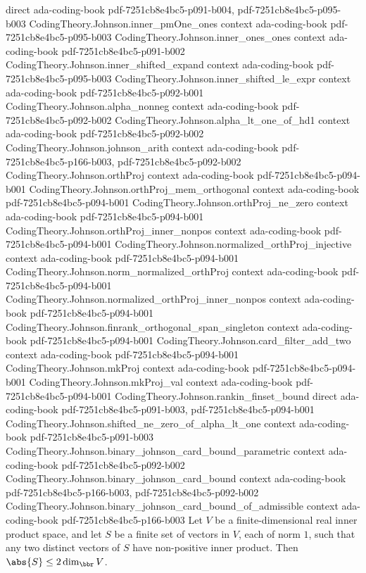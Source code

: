 \begin{theorem}
  {direct}
  {ada-coding-book}
  {pdf-7251cb8e4bc5-p091-b004,
    pdf-7251cb8e4bc5-p095-b003}
\proofstep
  {CodingTheory.Johnson.inner_pmOne_ones}
  {context}
  {ada-coding-book}
  {pdf-7251cb8e4bc5-p095-b003}
\proofstep
  {CodingTheory.Johnson.inner_ones_ones}
  {context}
  {ada-coding-book}
  {pdf-7251cb8e4bc5-p091-b002}
\proofstep
  {CodingTheory.Johnson.inner_shifted_expand}
  {context}
  {ada-coding-book}
  {pdf-7251cb8e4bc5-p095-b003}
\proofstep
  {CodingTheory.Johnson.inner_shifted_le_expr}
  {context}
  {ada-coding-book}
  {pdf-7251cb8e4bc5-p092-b001}
\proofstep
  {CodingTheory.Johnson.alpha_nonneg}
  {context}
  {ada-coding-book}
  {pdf-7251cb8e4bc5-p092-b002}
\proofstep
  {CodingTheory.Johnson.alpha_lt_one_of_hd1}
  {context}
  {ada-coding-book}
  {pdf-7251cb8e4bc5-p092-b002}
\proofstep
  {CodingTheory.Johnson.johnson_arith}
  {context}
  {ada-coding-book}
  {pdf-7251cb8e4bc5-p166-b003,
    pdf-7251cb8e4bc5-p092-b002}
\proofstep
  {CodingTheory.Johnson.orthProj}
  {context}
  {ada-coding-book}
  {pdf-7251cb8e4bc5-p094-b001}
\proofstep
  {CodingTheory.Johnson.orthProj_mem_orthogonal}
  {context}
  {ada-coding-book}
  {pdf-7251cb8e4bc5-p094-b001}
\proofstep
  {CodingTheory.Johnson.orthProj_ne_zero}
  {context}
  {ada-coding-book}
  {pdf-7251cb8e4bc5-p094-b001}
\proofstep
  {CodingTheory.Johnson.orthProj_inner_nonpos}
  {context}
  {ada-coding-book}
  {pdf-7251cb8e4bc5-p094-b001}
\proofstep
  {CodingTheory.Johnson.normalized_orthProj_injective}
  {context}
  {ada-coding-book}
  {pdf-7251cb8e4bc5-p094-b001}
\proofstep
  {CodingTheory.Johnson.norm_normalized_orthProj}
  {context}
  {ada-coding-book}
  {pdf-7251cb8e4bc5-p094-b001}
\proofstep
  {CodingTheory.Johnson.normalized_orthProj_inner_nonpos}
  {context}
  {ada-coding-book}
  {pdf-7251cb8e4bc5-p094-b001}
\proofstep
  {CodingTheory.Johnson.finrank_orthogonal_span_singleton}
  {context}
  {ada-coding-book}
  {pdf-7251cb8e4bc5-p094-b001}
\proofstep
  {CodingTheory.Johnson.card_filter_add_two}
  {context}
  {ada-coding-book}
  {pdf-7251cb8e4bc5-p094-b001}
\proofstep
  {CodingTheory.Johnson.mkProj}
  {context}
  {ada-coding-book}
  {pdf-7251cb8e4bc5-p094-b001}
\proofstep
  {CodingTheory.Johnson.mkProj_val}
  {context}
  {ada-coding-book}
  {pdf-7251cb8e4bc5-p094-b001}
\proofstep
  {CodingTheory.Johnson.rankin_finset_bound}
  {direct}
  {ada-coding-book}
  {pdf-7251cb8e4bc5-p091-b003,
    pdf-7251cb8e4bc5-p094-b001}
\proofstep
  {CodingTheory.Johnson.shifted_ne_zero_of_alpha_lt_one}
  {context}
  {ada-coding-book}
  {pdf-7251cb8e4bc5-p091-b003}
\proofstep
  {CodingTheory.Johnson.binary_johnson_card_bound_parametric}
  {context}
  {ada-coding-book}
  {pdf-7251cb8e4bc5-p092-b002}
\proofstep
  {CodingTheory.Johnson.binary_johnson_card_bound}
  {context}
  {ada-coding-book}
  {pdf-7251cb8e4bc5-p166-b003,
    pdf-7251cb8e4bc5-p092-b002}
\proofstep
  {CodingTheory.Johnson.binary_johnson_card_bound_of_admissible}
  {context}
  {ada-coding-book}
  {pdf-7251cb8e4bc5-p166-b003}
Let $V$ be a finite-dimensional real inner product space, and let $S$ be a finite set of
vectors in $V$, each of norm $1$, such that any two distinct vectors of $S$ have
non-positive inner product. Then $\abs{S} \le 2 \dim_{\bbr} V$.
\end{theorem}

